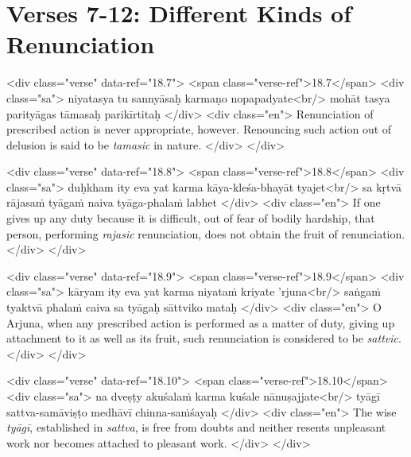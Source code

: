 \section{Verses 7-12: Different Kinds of Renunciation}\label{sec-verses-7-12-different-kinds-of-renunciation}


\begin{html}
<div class="verse" data-ref="18.7">
  <span class="verse-ref">18.7</span>
  <div class="sa">
    niyatasya tu sannyāsaḥ karmaṇo nopapadyate<br/>
    mohāt tasya parityāgas tāmasaḥ parikīrtitaḥ
  </div>
  <div class="en">
    Renunciation of prescribed action is never appropriate, however. Renouncing such action out of delusion is said to be \textit{tamasic} in nature.
  </div>
</div>
\end{html}



\begin{html}
<div class="verse" data-ref="18.8">
  <span class="verse-ref">18.8</span>
  <div class="sa">
    duḥkham ity eva yat karma kāya-kleśa-bhayāt tyajet<br/>
    sa kṛtvā rājasaṁ tyāgaṁ naiva tyāga-phalaṁ labhet
  </div>
  <div class="en">
    If one gives up any duty because it is difficult, out of fear of bodily hardship, that person, performing \textit{rajasic} renunciation, does not obtain the fruit of renunciation.
  </div>
</div>
\end{html}



\begin{html}
<div class="verse" data-ref="18.9">
  <span class="verse-ref">18.9</span>
  <div class="sa">
    kāryam ity eva yat karma niyataṁ kriyate ’rjuna<br/>
    saṅgaṁ tyaktvā phalaṁ caiva sa tyāgaḥ sāttviko mataḥ
  </div>
  <div class="en">
    O Arjuna, when any prescribed action is performed as a matter of duty, giving up attachment to it as well as its fruit, such renunciation is considered to be \textit{sattvic}.
  </div>
</div>
\end{html}



\begin{html}
<div class="verse" data-ref="18.10">
  <span class="verse-ref">18.10</span>
  <div class="sa">
    na dveṣṭy akuśalaṁ karma kuśale nānuṣajjate<br/>
    tyāgī sattva-samāviṣṭo medhāvī chinna-saṁśayaḥ
  </div>
  <div class="en">
    The wise \textit{tyāgī}, established in \textit{sattva}, is free from doubts and neither resents unpleasant work nor becomes attached to pleasant work.
  </div>
</div>
\end{html}



